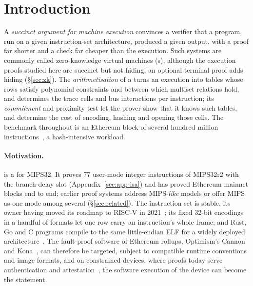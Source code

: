 \section{Introduction}
\label{sec:intro}

A \emph{succinct argument for machine execution} convinces a verifier that a program, run on a given instruction-set architecture, produced a given output, with a proof far shorter and a check far cheaper than the execution. Such systems are commonly called zero-knowledge virtual machines (\zkVM{}s), although the execution proofs studied here are succinct but not hiding; an optional terminal proof adds hiding (\S\ref{sec:zk}). The \emph{arithmetisation} of a \zkVM{} turns an execution into tables whose rows satisfy polynomial constraints and between which multiset relations hold, and determines the trace cells and bus interactions per instruction; its \emph{commitment} and proximity test let the prover show that it knows such tables, and determine the cost of encoding, hashing and opening those cells. The benchmark throughout is an Ethereum block of several hundred million instructions~\citep{ethproofs}, a hash-intensive workload.

\paragraph{Motivation.} \Ziren{} is a \zkVM{} for MIPS32. It proves 77 user-mode integer instructions of MIPS32r2 with the branch-delay slot (Appendix~\ref{sec:app-isa}) and has proved Ethereum mainnet blocks end to end; earlier proof systems address MIPS-\emph{like} models or offer MIPS as one mode among several (\S\ref{sec:related}). The instruction set is stable, its owner having moved its roadmap to RISC-V in 2021~\citep{mips-riscv-2021,mips-at-40}; its fixed 32-bit encodings in a handful of formats let one row carry an instruction's whole frame; and Rust, Go and C programs compile to the same little-endian ELF for a widely deployed architecture~\citep{mips-shipped}. The fault-proof software of Ethereum rollups, Optimism's Cannon and Kona~\citep{cannon,kona}, can therefore be targeted, subject to compatible runtime conventions and image formats, and on constrained devices, where proofs today serve authentication and attestation~\citep{zk-iot-survey,zpie,zekra,zra}, the software execution of the device can become the statement.


